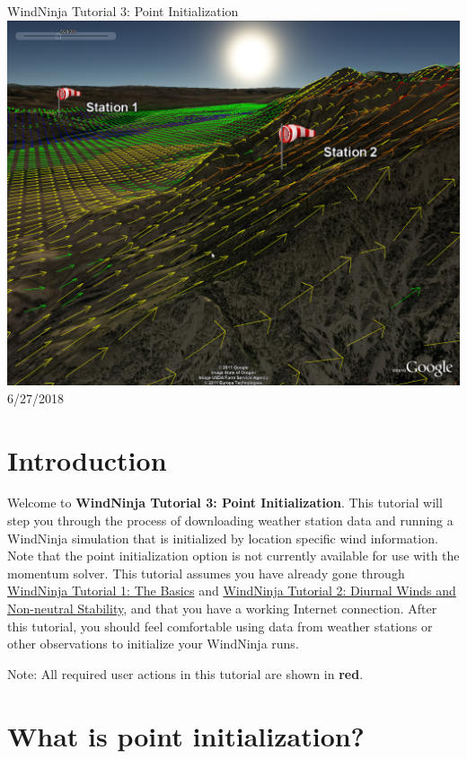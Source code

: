 \documentclass[12pt]{article}
\begin{document}
\begin{titlepage}
    \centering
    {\Huge
       WindNinja Tutorial 3: Point Initialization
    }    
    \vfill
    \includegraphics[scale=0.35]							{title_fig}
    \vfill
  	{\Huge
	  6/27/2018 %
  	}
    \vfill
\end{titlepage}
\section*{Introduction}

Welcome to \textbf{WindNinja Tutorial 3: Point Initialization}.  This tutorial will step you through the process of downloading weather station data and running a WindNinja simulation that is initialized by location specific wind information.  Note that the point initialization option is not currently available for use with the momentum solver. This tutorial assumes you have already gone through \href{https://weather.firelab.org/windninja/tutorials/WindNinja_tutorial1.pdf}{WindNinja Tutorial 1: The Basics} and \href{https://weather.firelab.org/windninja/tutorials/WindNinja_tutorial2.pdf}{WindNinja Tutorial 2: Diurnal Winds and Non-neutral Stability}, and that you have a working Internet connection. After this tutorial, you should feel comfortable using data from weather stations or other observations to initialize your WindNinja runs.

Note:  All required user actions in this tutorial are shown in \textbf{\color{red}red}.

\section*{What is point initialization?}
\end{document}
